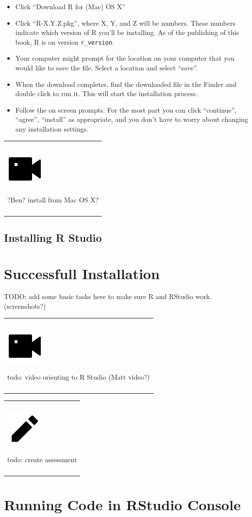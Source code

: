 \documentclass[
]{book}
\providecommand{\tightlist}{%
  \setlength{\itemsep}{0pt}\setlength{\parskip}{0pt}}
\newenvironment{assessment}
{
  \begin{center}
  \begin{tabular}{|>{\columncolor{assessment}}p{0.9\textwidth}|}
  \hline\\
  \includegraphics[scale=0.1]{src/images/pencil-fill.png}
}
{\\\\\hline
  \end{tabular}
  \end{center}
}
\newenvironment{video}
{
  \begin{center}
  \begin{tabular}{|>{\columncolor{video}}p{0.9\textwidth}|}
  \hline\\
  \includegraphics[scale=0.1]{src/images/vidicon-fill.png}
}
{\\\\\hline
  \end{tabular}
  \end{center}
}
\begin{document}
\begin{itemize}
\tightlist
\item
  Click ``Download R for (Mac) OS X''
\item
  Click ``R-X.Y.Z.pkg'', where X, Y, and Z will be numbers. These numbers indicate which version of R you'll be installing. As of the publishing of this book, R is on version \texttt{r\_version}.
\item
  Your computer might prompt for the location on your computer that you would like to save the file. Select a location and select ``save''.
\item
  When the download completes, find the downloaded file in the Finder and double click to run it. This will start the installation process.
\item
  Follow the on screen prompts. For the most part you can click ``continue'', ``agree'', ``install'' as appropriate, and you don't have to worry about changing any installation settings.
\end{itemize}

\begin{video}
?Ben? install from Mac OS X?
\end{video}

\hypertarget{installing-r-studio}{%
\subsection{Installing R Studio}\label{installing-r-studio}}

\hypertarget{successfull-installation}{%
\section{Successfull Installation}\label{successfull-installation}}

TODO: add some basic tasks here to make sure R and RStudio work. (screenshots?)

\begin{video}
todo: video orienting to R Studio (Matt video?)
\end{video}

\begin{assessment}
todo: create assessment
\end{assessment}

\hypertarget{running-code-in-rstudio-console}{%
\section{Running Code in RStudio Console}\label{running-code-in-rstudio-console}}
\end{document}
